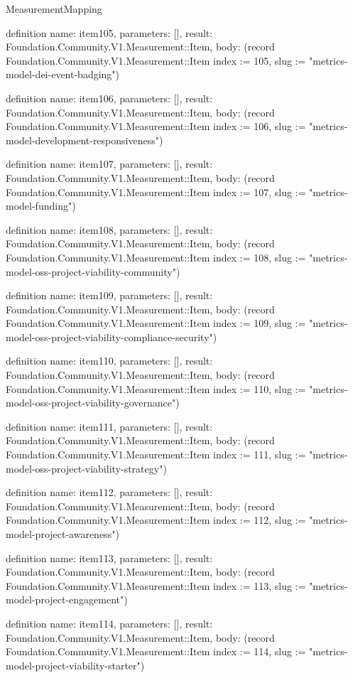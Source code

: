 \begin{lexlean}{MeasurementMapping}
\begin{semanticmodule}
definition{
  name: item105,
  parameters: [],
  result: Foundation.Community.V1.Measurement::Item,
  body: (record Foundation.Community.V1.Measurement::Item {index := 105, slug := "metrics-model-dei-event-badging"})
}

definition{
  name: item106,
  parameters: [],
  result: Foundation.Community.V1.Measurement::Item,
  body: (record Foundation.Community.V1.Measurement::Item {index := 106, slug := "metrics-model-development-responsiveness"})
}

definition{
  name: item107,
  parameters: [],
  result: Foundation.Community.V1.Measurement::Item,
  body: (record Foundation.Community.V1.Measurement::Item {index := 107, slug := "metrics-model-funding"})
}

definition{
  name: item108,
  parameters: [],
  result: Foundation.Community.V1.Measurement::Item,
  body: (record Foundation.Community.V1.Measurement::Item {index := 108, slug := "metrics-model-oss-project-viability-community"})
}

definition{
  name: item109,
  parameters: [],
  result: Foundation.Community.V1.Measurement::Item,
  body: (record Foundation.Community.V1.Measurement::Item {index := 109, slug := "metrics-model-oss-project-viability-compliance-security"})
}

definition{
  name: item110,
  parameters: [],
  result: Foundation.Community.V1.Measurement::Item,
  body: (record Foundation.Community.V1.Measurement::Item {index := 110, slug := "metrics-model-oss-project-viability-governance"})
}

definition{
  name: item111,
  parameters: [],
  result: Foundation.Community.V1.Measurement::Item,
  body: (record Foundation.Community.V1.Measurement::Item {index := 111, slug := "metrics-model-oss-project-viability-strategy"})
}

definition{
  name: item112,
  parameters: [],
  result: Foundation.Community.V1.Measurement::Item,
  body: (record Foundation.Community.V1.Measurement::Item {index := 112, slug := "metrics-model-project-awareness"})
}

definition{
  name: item113,
  parameters: [],
  result: Foundation.Community.V1.Measurement::Item,
  body: (record Foundation.Community.V1.Measurement::Item {index := 113, slug := "metrics-model-project-engagement"})
}

definition{
  name: item114,
  parameters: [],
  result: Foundation.Community.V1.Measurement::Item,
  body: (record Foundation.Community.V1.Measurement::Item {index := 114, slug := "metrics-model-project-viability-starter"})
}


\end{semanticmodule}
\end{lexlean}
